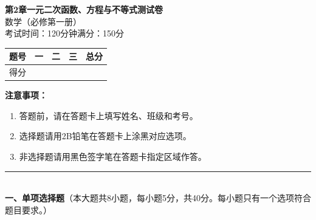 \documentclass[12pt, a4paper]{ctexart}
\begin{document}
\begin{center}
{\Large\bfseries 第2章\quad 一元二次函数、方程与不等式\quad 测试卷}\\[6pt]
{\normalsize 数学（必修第一册）}\\[4pt]
{\small 考试时间：120分钟\quad 满分：150分}
\end{center}

\vspace{2pt}
\begin{center}
\begin{tabular}{|c|c|c|c|c|}
\hline
题号 & 一 & 二 & 三 & 总分 \\ \hline
得分 & & & & \\ \hline
\end{tabular}
\end{center}
\vspace{4pt}

\noindent\textbf{注意事项：}
\begin{enumerate}[leftmargin=2em]
  \item 答题前，请在答题卡上填写姓名、班级和考号。
  \item 选择题请用2B铅笔在答题卡上涂黑对应选项。
  \item 非选择题请用黑色签字笔在答题卡指定区域作答。
\end{enumerate}

\vspace{6pt}

\noindent\rule{\textwidth}{0.4pt}\\[2pt]
{\large\bfseries 一、单项选择题}（本大题共8小题，每小题5分，共40分。每小题只有一个选项符合题目要求。）

\vspace{6pt}
\end{document}
